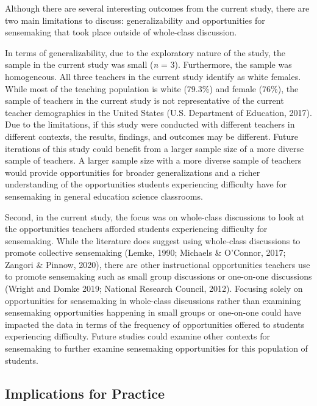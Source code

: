 \documentclass{sig-alternate} %
\begin{document}
\begin{large}
Although there are several interesting outcomes from the current study, there are two main limitations to discuss: generalizability and opportunities for sensemaking that took place outside of whole-class discussion. 

In terms of generalizability, due to the exploratory nature of the study, the sample in the current study was small (\textit{n} = 3). Furthermore, the sample was homogeneous. All three teachers in the current study identify as white females. While most of the teaching population is white (79.3\%) and female (76\%), the sample of teachers in the current study is not representative of the current teacher demographics in the United States (U.S. Department of Education, 2017). Due to the limitations, if this study were conducted with different teachers in different contexts, the results, findings, and outcomes may be different. Future iterations of this study could benefit from a larger sample size of a more diverse sample of teachers. A larger sample size with a more diverse sample of teachers would provide opportunities for broader generalizations and a richer understanding of the opportunities students experiencing difficulty have for sensemaking in general education science classrooms. 

Second, in the current study, the focus was on whole-class discussions to look at the opportunities teachers afforded students experiencing difficulty for sensemaking. While the literature does suggest using whole-class discussions to promote collective sensemaking (Lemke, 1990; Michaels \& O'Connor, 2017; Zangori \& Pinnow, 2020), there are other instructional opportunities teachers use to promote sensemaking such as small group discussions or one-on-one discussions (Wright and Domke 2019; National Research Council, 2012). Focusing solely on opportunities for sensemaking in whole-class discussions rather than examining sensemaking opportunities happening in small groups or one-on-one could have impacted the data in terms of the frequency of opportunities offered to students experiencing difficulty. Future studies could examine other contexts for sensemaking to further examine sensemaking opportunities for this population of students. 

\subsection*{Implications for Practice}


\end{large}
\end{document}
